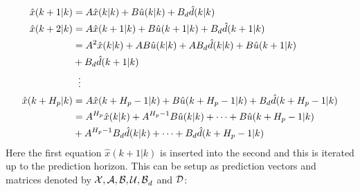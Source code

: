 \begin{equation}\label{eq:iterating_state_equation}
\begin{aligned}
	\hat{x}(k+1|k) &= A\hat{x}(k|k)+B\hat{u}(k|k) + B_d\hat{d}(k|k)\\
	\hat{x}(k+2|k) &= A\hat{x}(k+1|k)+B\hat{u}(k+1|k)+ B_d\hat{d}(k+1|k) \\
				   &= A^2\hat{x}(k|k)+AB\hat{u}(k|k)+AB_d\hat{d}(k|k) + B\hat{u}(k+1|k) \\
				   &+ B_d\hat{d}(k+1|k) \\
				   &\hspace{2mm}\vdots\\
   \hat{x}(k+H_p|k)&= A\hat{x}(k+H_p-1|k)+B\hat{u}(k+H_p-1|k)+B_d\hat{d}(k+H_p-1|k)\\
   				   &= A^{H_p}\hat{x}(k|k)+A^{H_p-1}B\hat{u}(k|k)+\cdots+ B\hat{u}(k+H_p-1|k)\\
   				   &+A^{H_p-1}B_d\hat{d}(k|k)+\cdots+B_d\hat{d}(k+H_p-1|k)
\end{aligned}
\end{equation}
Here the first equation $\hat{x}(k+1|k)$ is inserted into the second and this is iterated up to the prediction horizon. This can be setup as prediction vectors and matrices denoted by $\CMcal{X,A,B,U,B}_d$ and $\CMcal{D}$:




